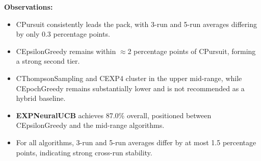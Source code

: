 \documentclass[12pt,a4paper]{article}
\newcommand{\legacy}[1]{\textcolor{legacycolor}{\textbf{#1}}}
\begin{document}
\begin{tcolorbox}[colback=performancecolor!10,colframe=performancecolor,title=\textbf{Primary Performance Results (Aggregated Across Capacities, Environments, and Regimes)}]
\textbf{Observations:}
\begin{itemize}
\item CPursuit consistently leads the pack, with 3-run and 5-run averages differing by only 0.3 percentage points.
\item CEpsilonGreedy remains within $\approx$2 percentage points of CPursuit, forming a strong second tier.
\item CThompsonSampling and CEXP4 cluster in the upper mid-range, while CEpochGreedy remains substantially lower and is not recommended as a hybrid baseline.
\item \legacy{EXPNeuralUCB} achieves 87.0\% overall, positioned between CEpsilonGreedy and the mid-range algorithms.
\item For all algorithms, 3-run and 5-run averages differ by at most 1.5 percentage points, indicating strong cross-run stability.
\end{itemize}

\end{tcolorbox}
\end{document}
